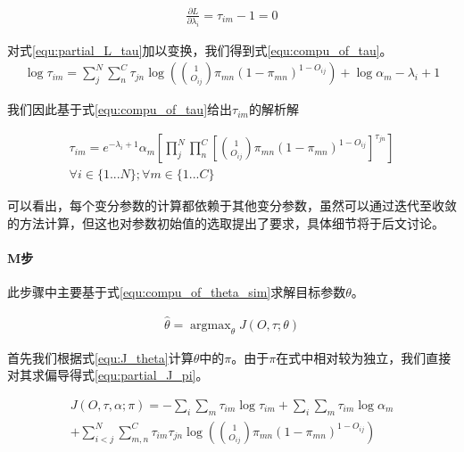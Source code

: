 \begin{equation}\label{equ:partial_L_lambda}
  \begin{aligned}
\frac{\partial L}{\partial \lambda_i}=\tau_{im}-1=0
\end{aligned}\end{equation}

对式\ref{equ:partial_L_tau}加以变换，我们得到式\ref{equ:compu_of_tau}。
\begin{equation}\label{equ:compu_of_tau}
  \begin{aligned}
\log \tau_{im} =\sum_{j}^N\sum_{n}^C\tau_{jn}\log ( \binom{1}{O_{ij}}\pi_{mn}(1-\pi_{mn})^{1-O_{ij}})+\log \alpha_m -\lambda_i+1
\end{aligned}\end{equation}

我们因此基于式\ref{equ:compu_of_tau}给出$\tau_{im}$的解析解

\begin{equation}\label{equ:solution_of_tau}
  \begin{aligned}
\tau_{im} = e^{-\lambda_i+1}\alpha_m[\prod_j^N\prod_n^C[ \binom{1}{O_{ij}}\pi_{mn}(1-\pi_{mn})^{1-O_{ij}}]^{\tau_{jn}}]\\
\forall i \in \{1 ...N\} ;\forall m \in \{1 ... C\}
\end{aligned}\end{equation}

可以看出，每个变分参数的计算都依赖于其他变分参数，虽然可以通过迭代至收敛的方法计算，但这也对参数初始值的选取提出了要求，具体细节将于后文讨论。

\paragraph*{M步}此步骤中主要基于式\ref{equ:compu_of_theta_sim}求解目标参数$\theta$。

\begin{equation}\label{equ:compu_of_theta_sim}
  \begin{aligned}
\hat{\theta}=\mathop{\arg\max}_\theta J(O,\tau;\theta)
\end{aligned}\end{equation}

首先我们根据式\ref{equ:J_theta}计算$\theta$中的$\pi$。由于$\pi$在式中相对较为独立，我们直接对其求偏导得式\ref{equ:partial_J_pi}。

\begin{equation}\label{equ:J_theta}
  \begin{aligned}
J(O,\tau,\alpha;\pi)=-\sum_i\sum_m\tau_{im} \log \tau_{im} +\sum_i\sum_m \tau_{im} \log \alpha_m\\ +\sum_{i<j}^N\sum_{m,n}^C\tau_{im}\tau_{jn}\log ( \binom{1}{O_{ij}}\pi_{mn}(1-\pi_{mn})^{1-O_{ij}})
\end{aligned}\end{equation}

